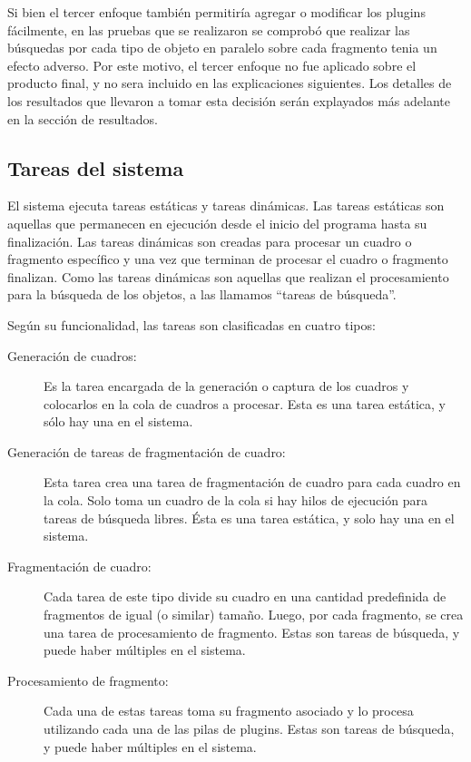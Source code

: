 Si bien el tercer enfoque también permitiría agregar o modificar los plugins
fácilmente, en las pruebas que se realizaron se comprobó que realizar las
búsquedas por cada tipo de objeto en paralelo sobre cada fragmento tenia un
efecto adverso. Por este motivo, el tercer enfoque no fue aplicado sobre el
producto final, y no sera incluido en las explicaciones siguientes. Los detalles
de los resultados que llevaron a tomar esta decisión serán explayados más
adelante en la sección de resultados.

\subsection{Tareas del sistema}

El sistema ejecuta tareas estáticas y tareas dinámicas. Las tareas estáticas son
aquellas que permanecen en ejecución desde el inicio del programa hasta su
finalización. Las tareas dinámicas son creadas para procesar un cuadro o
fragmento específico y una vez que terminan de procesar el cuadro o fragmento
finalizan. Como las tareas dinámicas son aquellas que realizan el procesamiento
para la búsqueda de los objetos, a las llamamos ``tareas de búsqueda''.

Según su funcionalidad, las tareas son clasificadas en cuatro tipos:

\begin{description}

	\item[Generación de cuadros:] Es la tarea encargada de la generación o
		captura de los cuadros y colocarlos en la cola de cuadros a
		procesar. Esta es una tarea estática, y sólo hay una en el
		sistema.

	\item[Generación de tareas de fragmentación de cuadro:] Esta tarea crea
		una tarea de fragmentación de cuadro para cada cuadro en la
		cola. Solo toma un cuadro de la cola si hay hilos de ejecución
		para tareas de búsqueda libres. Ésta es una tarea estática, y
		solo hay una en el sistema.

	\item[Fragmentación de cuadro:] Cada tarea de este tipo divide su cuadro
		en una cantidad predefinida de fragmentos de igual (o similar)
		tamaño. Luego, por cada fragmento, se crea una tarea de
		procesamiento de fragmento. Estas son tareas de búsqueda, y
		puede haber múltiples en el sistema.

	\item[Procesamiento de fragmento:] Cada una de estas tareas toma su
		fragmento asociado y lo procesa utilizando cada una de las pilas
		de plugins. Estas son tareas de búsqueda, y puede haber
		múltiples en el sistema.

\end{description}

